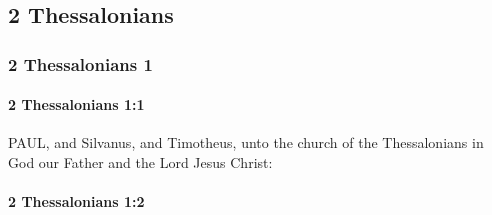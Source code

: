 \subsection{2 Thessalonians}
	\label{2THESSALONIANS}

	\subsubsection{2 Thessalonians 1} %
		\label{2THESSALONIANS-1}
		
		\paragraph{2 Thessalonians 1:1} %
			\label{2THESSALONIANS-1-1}

			PAUL, and Silvanus, and Timotheus, unto the church of the Thessalonians in God our Father and the Lord Jesus Christ:

			\begin{framed}
			\scriptsize
				\begin{compactdesc}
					\item[SBLG] 
				\end{compactdesc}
			\end{framed}

		\paragraph{2 Thessalonians 1:2} %
			\label{2THESSALONIANS-1-2}

